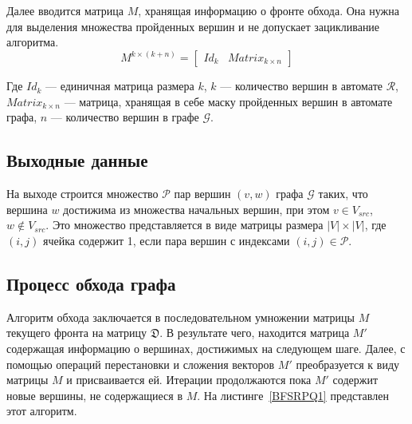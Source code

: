 Далее вводится матрица $M$, хранящая информацию о фронте обхода. Она нужна для выделения множества пройденных вершин и не допускает зацикливание алгоритма.
\begin{equation}
M^{k \times (k + n)} =
  \left[
    \begin{matrix}
        Id_k & Matrix_{k \times n }
    \end{matrix}
  \right]
\end{equation}

Где $Id_k$ --- единичная матрица размера $k$, $k$ --- количество вершин в автомате $\mathcal{R}$, $Matrix_{k \times n }$ --- матрица, хранящая в себе маску пройденных вершин в автомате графа, $n$ --- количество вершин в графе $\mathcal{G}$.

\subsection{Выходные данные}

На выходе строится множество $\mathcal{P}$ пар вершин $(v, w)$ графа $\mathcal{G}$ таких, что вершина $w$ достижима из множества начальных вершин, при этом $v \in V_{src}$, $w \not\in V_{src}$. Это множество представляется в виде матрицы размера $|V|\times|V|$, где $(i,j)$ ячейка содержит 1, если пара вершин с индексами $(i, j) \in \mathcal{P}$.

\subsection{Процесс обхода графа}

Алгоритм обхода заключается в последовательном умножении матрицы $M$ текущего фронта на матрицу $\mathfrak{D}$. В результате чего, находится матрица $M'$ содержащая информацию о вершинах, достижимых на следующем шаге. Далее, с помощью операций перестановки и сложения векторов $M'$ преобразуется к виду матрицы $M$ и присваивается ей. Итерации продолжаются пока $M'$ содержит новые вершины, не содержащиеся в $M$. На листинге~\ref{BFSRPQ1} представлен этот алгоритм.

